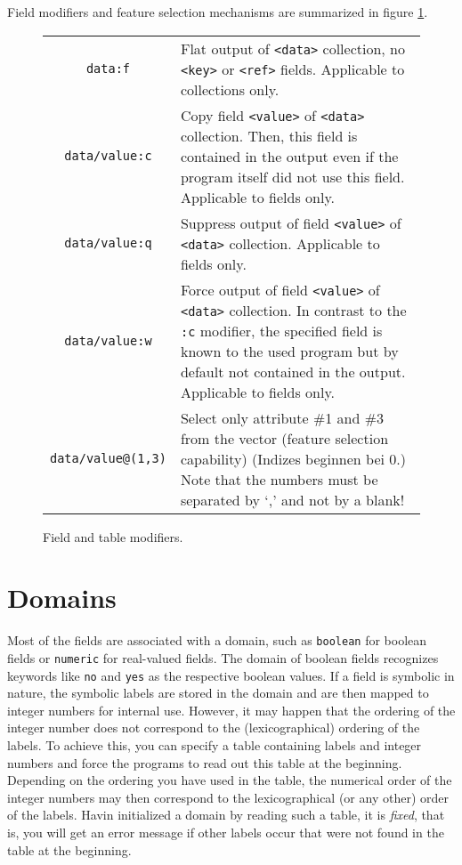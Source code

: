 \documentclass[a4paper]{book}
\begin{document}
Field modifiers and feature selection mechanisms are summarized in
figure \ref{modcmd:fig}.

\begin{figure}[htb]
\begin{center}\begin{tabular}{|c|p{8cm}|}
\hline
{\tt data:f} & Flat output of {\tt <data>} collection, no {\tt <key>}
or {\tt <ref>} fields. Applicable to collections only.
\\
{\tt data/value:c} & Copy field {\tt <value>} of {\tt <data>}
collection. Then, this field is contained in the output even if the
program itself did not use this field. Applicable to fields only.
\\
{\tt data/value:q} & Suppress output of field {\tt <value>} of {\tt <data>}
collection. Applicable to fields only.
\\
{\tt data/value:w} & Force output of field {\tt <value>} of {\tt <data>}
collection. In contrast to the {\tt :c} modifier, the specified field
is known to the used program but by default not contained in the
output. Applicable to fields only.
\\
{\tt data/value@(1,3)} & Select only attribute \#1 and \#3 from the vector
  (feature selection capability)\index{feature selection} (Indizes beginnen
  bei 0.) Note that the numbers must be separated by `,' and not by a blank!\\
\hline
\end{tabular}
\caption{\label{modcmd:fig}Field and table modifiers.}
\end{center}\end{figure}

\section{Domains}

Most of the fields are associated with a domain, such as {\tt boolean}
for boolean fields or {\tt numeric} for real-valued fields. The domain
of boolean fields recognizes keywords like {\tt no} and {\tt yes} as
the respective boolean values. If a field is symbolic in nature, the
symbolic labels are stored in the domain and are then mapped to
integer numbers for internal use.  However, it may happen that the
ordering of the integer number does not correspond to the
(lexicographical) ordering of the labels. To achieve this, you can
specify a table containing labels and integer numbers and force the
programs to read out this table at the beginning. Depending on the
ordering you have used in the table, the numerical order of the
integer numbers may then correspond to the lexicographical (or any
other) order of the labels. Havin initialized a domain by reading such
a table, it is {\sl fixed}, that is, you will get an error message if
other labels occur that were not found in the table at the beginning.
\end{document}
